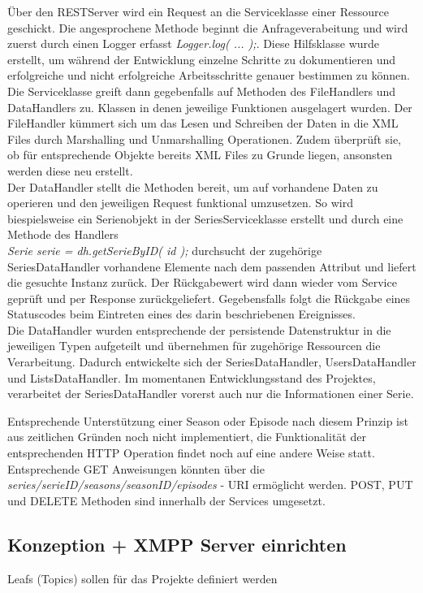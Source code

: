 \documentclass[a4paper]{article}
\begin{document}
Über den RESTServer wird ein Request an die Serviceklasse einer Ressource geschickt. Die angesprochene Methode beginnt die Anfrageverabeitung und wird zuerst durch einen Logger erfasst \textit{  Logger.log( ... );}. Diese Hilfsklasse wurde erstellt, um während der Entwicklung einzelne Schritte zu dokumentieren und erfolgreiche und nicht erfolgreiche Arbeitsschritte genauer bestimmen zu können. Die Serviceklasse greift dann gegebenfalls auf Methoden des FileHandlers und DataHandlers zu. Klassen in denen jeweilige Funktionen ausgelagert wurden. Der FileHandler kümmert sich um das Lesen und Schreiben der Daten in die XML Files durch Marshalling und Unmarshalling Operationen. Zudem überprüft sie, ob für entsprechende Objekte bereits XML Files zu Grunde liegen, ansonsten werden diese neu erstellt. \\
Der DataHandler stellt die Methoden bereit, um auf vorhandene Daten zu operieren und den jeweiligen Request funktional umzusetzen. So wird biespielsweise ein Serienobjekt in der SeriesServiceklasse erstellt und durch eine Methode des Handlers \\\textit{      Serie serie = dh.getSerieByID( id ); } durchsucht der zugehörige SeriesDataHandler  vorhandene Elemente nach dem passenden Attribut und liefert die gesuchte Instanz zurück. Der Rückgabewert wird dann wieder vom Service geprüft und per Response zurückgeliefert. Gegebensfalls folgt die Rückgabe eines Statuscodes beim Eintreten eines des darin beschriebenen Ereignisses.\\
Die DataHandler wurden entsprechende der persistende Datenstruktur in die jeweiligen Typen aufgeteilt und übernehmen für zugehörige Ressourcen die Verarbeitung. Dadurch entwickelte sich der SeriesDataHandler, UsersDataHandler und ListsDataHandler. Im momentanen Entwicklungsstand des Projektes, verarbeitet der SeriesDataHandler vorerst auch nur die Informationen einer Serie. 

\newpage
Entsprechende Unterstützung einer Season oder Episode nach diesem Prinzip ist aus zeitlichen Gründen noch nicht implementiert, die Funktionalität der entsprechenden HTTP Operation findet noch auf eine andere Weise statt. Entsprechende GET Anweisungen könnten über die \textit{series/{serieID}/seasons/{seasonID}/episodes} - URI ermöglicht werden. POST, PUT und DELETE Methoden sind innerhalb der Services umgesetzt. 




\newpage

\subsection{Konzeption + XMPP Server einrichten}
Leafs (Topics) sollen für das Projekte definiert werden
\end{document}
